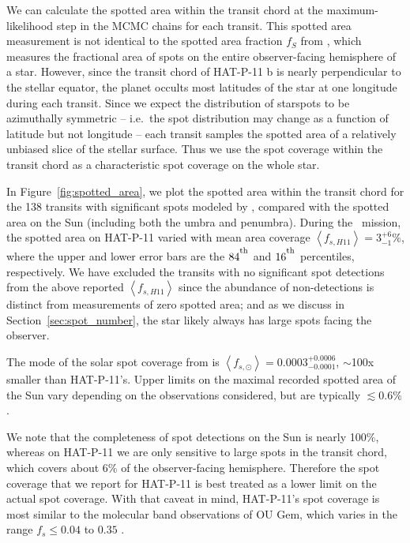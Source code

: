 We can calculate the spotted area within the transit chord at the maximum-likelihood step in the MCMC chains for each transit. This spotted area measurement is not identical to the spotted area fraction $f_S$ from \citet{ONeal2001, ONeal2004}, which measures the fractional area of spots on the entire observer-facing hemisphere of a star. However, since the transit chord of HAT-P-11 b is nearly perpendicular to the stellar equator, the planet occults most latitudes of the star at one longitude during each transit. Since we expect the distribution of starspots to be azimuthally symmetric -- i.e.~the spot distribution may change as a function of latitude but not longitude -- each transit samples the spotted area of a relatively unbiased slice of the stellar surface. Thus we use the spot coverage within the transit chord as a characteristic spot coverage on the whole star.

In Figure~\ref{fig:spotted_area}, we plot the spotted area within the transit chord for the 138 transits with significant spots modeled by \stsp, compared with the spotted area on the Sun (including both the umbra and penumbra). During the \kepler\ mission, the spotted area on HAT-P-11 varied with mean area coverage $\left< f_{s,H11} \right> = 3^{+6}_{-1} \%$, where the upper and lower error bars are the $84^\textsuperscript{th}$ and $16^\textsuperscript{th}$ percentiles, respectively. We have excluded the transits with no significant spot detections from the above reported $\left< f_{s,H11} \right>$ since the abundance of non-detections is distinct from measurements of zero spotted area; and as we discuss in Section~\ref{sec:spot_number}, the star likely always has large spots facing the observer.

The mode of the solar spot coverage from \citet{Howard1984} is $\left< f_{s,\odot} \right> = 0.0003^{+0.0006}_{-0.0001}$, $\sim$100x smaller than HAT-P-11's. Upper limits on the maximal recorded spotted area of the Sun vary depending on the observations considered, but are typically $\lesssim 0.6\%$ \citep{Balmaceda2009}.

We note that the completeness of spot detections on the Sun is nearly 100\%, whereas on HAT-P-11 we are only sensitive to large spots in the transit chord, which covers about 6\% of the observer-facing hemisphere. Therefore the spot coverage that we report for HAT-P-11 is best treated as a lower limit on the actual spot coverage. With that caveat in mind, HAT-P-11's spot coverage is most similar to the molecular band observations of OU Gem, which varies in the range $f_s \le 0.04$ to $0.35$ \citep{ONeal2001}. 

